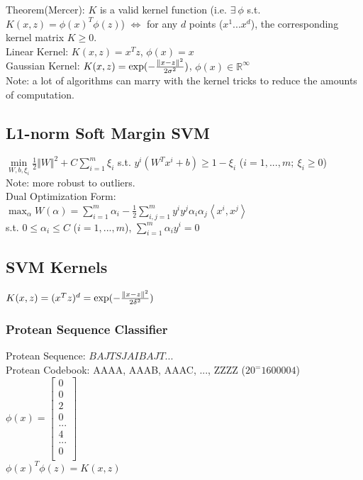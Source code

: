\documentclass{article}
\begin{document}
\noindent
Theorem(Mercer): $K$ is a valid kernel function (i.e. $\exists\ \phi$ s.t. $K(x,z)={\phi(x)}^T\phi(z)$) $\iff$ for any $d$ points ($x^1 ... x^d$), the corresponding kernel matrix $K \geq 0$.\\

\noindent
Linear Kernel: $K(x,z) = x^Tz$, $\phi(x) = x$\\
Gaussian Kernel: $K(x,z) = {\rm exp} (-\frac{{\Vert x-z \Vert}^2}{{2\sigma}^2})$, $\phi(x) \in \mathbb{R}^\infty$\\

\noindent
Note: a lot of algorithms can marry with the kernel tricks to reduce the amounts of computation.

\subsection{L1-norm Soft Margin SVM}
$\min\limits_{W,b,\xi_i} \frac{1}{2}{\Vert W \Vert}^2+ C\sum\limits_{i=1}^m\xi_i$ s.t. $y^i(W^Tx^i+b) \geq 1-\xi_i$ ($i=1,...,m;\ \xi_i \geq 0$)\\
Note: more robust to outliers.\\

\noindent
Dual Optimization Form: \\
$\max_\alpha W(\alpha) = \sum\limits_{i=1}^m\alpha_i - \frac{1}{2}\sum\limits_{i,j=1}^my^iy^j\alpha_i\alpha_j\left< x^i,x^j \right>$\\
s.t. $0 \leq \alpha_i \leq C$ ($i = 1, ..., m$), $\sum\limits_{i=1}^m\alpha_iy^i=0$

\subsection{SVM Kernels}
$K(x,z) = (x^Tz)^d = {\rm exp}(-\frac{{\Vert x-z \Vert}^2}{2\delta^2})$
\subsubsection{Protean Sequence Classifier}
Protean Sequence: $BAJTSJAIBAJT...$\\
Protean Codebook: AAAA, AAAB, AAAC, ..., ZZZZ ($20^=1600004$)\\
$\phi(x)=\begin{bmatrix}
  0\\
  0\\
  2\\
  0\\
  ...\\
  4\\
  ...\\
  0\\
  \end{bmatrix}$\\
$\phi(x)^T\phi(z)=K(x,z)$
\end{document}
